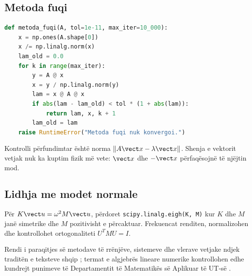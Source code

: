 \subsection{Metoda fuqi}
\begin{lstlisting}[language=Python,caption={Vlera vetjake dominante dhe kuocienti Rayleigh.}]
def metoda_fuqi(A, tol=1e-11, max_iter=10_000):
    x = np.ones(A.shape[0])
    x /= np.linalg.norm(x)
    lam_old = 0.0
    for k in range(max_iter):
        y = A @ x
        x = y / np.linalg.norm(y)
        lam = x @ A @ x
        if abs(lam - lam_old) < tol * (1 + abs(lam)):
            return lam, x, k + 1
        lam_old = lam
    raise RuntimeError("Metoda fuqi nuk konvergoi.")
\end{lstlisting}
Kontrolli përfundimtar është norma $\|A\vect x-\lambda\vect x\|$. Shenja e vektorit vetjak nuk ka kuptim fizik më vete: $\vect x$ dhe $-\vect x$ përfaqësojnë të njëjtin mod.

\subsection{Lidhja me modet normale}
Për $K\vect u=\omega^2M\vect u$, përdoret \texttt{scipy.linalg.eigh(K, M)} kur $K$ dhe $M$ janë simetrike dhe $M$ pozitivisht e përcaktuar. Frekuencat renditen, normalizohen dhe kontrollohet ortogonaliteti $U^TMU=I$.

Rendi i paraqitjes së metodave të rrënjëve, sistemeve dhe vlerave vetjake ndjek traditën e teksteve shqip \cite{hanelli,hoxha,datja}; termat e algjebrës lineare numerike kontrollohen edhe kundrejt punimeve të Departamentit të Matematikës së Aplikuar të UT-së \cite{zeqiri2020}.
